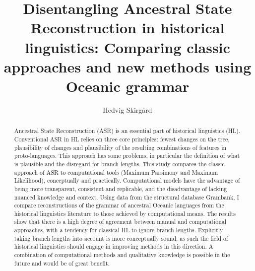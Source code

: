\documentclass[12pt,letterpaper]{article}
\title{Disentangling Ancestral State Reconstruction in historical linguistics: Comparing classic approaches and new methods using Oceanic grammar}
\author[1]{Hedvig Skirgård}
\affil[1]{Department of Linguistic and Cultural Evolution, Max Planck Institute for Evolutionary Anthropology. Leipzig, Germany.}
\begin{document}

\thispagestyle{empty}


\maketitle
\thispagestyle{empty}





\begin{abstract}

Ancestral State Reconstruction (ASR) is an essential part of historical linguistics (HL). Conventional ASR in HL relies on three core principles: fewest changes on the tree,  plausibility of changes and plausibility of the resulting combinations of features in proto-languages. This approach has some problems, in particular the definition of what is plausible and the disregard for branch lengths. This study compares the classic approach of ASR to computational tools (Maximum Parsimony and Maximum Likelihood), conceptually and practically. Computational models have the advantage of being more transparent, consistent and replicable, and the disadvantage of lacking nuanced knowledge and context. Using data from the structural database Grambank, I compare reconstructions of the grammar of ancestral Oceanic languages from the historical linguistics literature to those achieved by computational means. The results show that there is a high degree of agreement between manual and computational approaches, with a tendency for classical HL to ignore branch lengths. Explicitly taking branch lengths into account is more conceptually sound; as such the field of historical linguistics should engage in improving methods in this direction. A combination of computational methods and qualitative knowledge is possible in the future and would be of great benefit.


\end{abstract}
\end{document}

